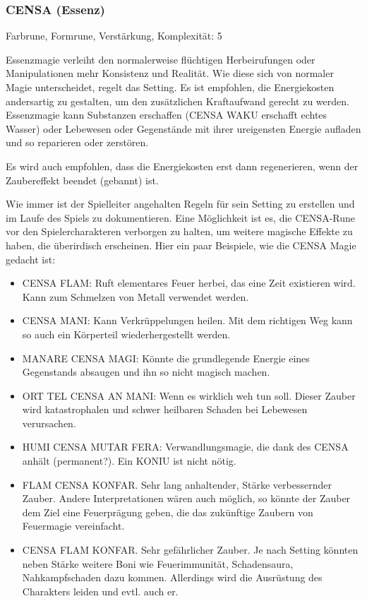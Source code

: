 \documentclass{article}
\begin{document}
\subsubsection{CENSA (Essenz)}

Farbrune, Formrune, Verstärkung, Komplexität: 5

Essenzmagie verleiht den normalerweise flüchtigen Herbeirufungen oder Manipulationen mehr Konsistenz und Realität. Wie
diese sich von normaler Magie unterscheidet, regelt das Setting. Es ist empfohlen, die Energiekosten andersartig zu
gestalten, um den zusätzlichen Kraftaufwand gerecht zu werden. Essenzmagie kann Substanzen erschaffen (CENSA WAKU
erschafft echtes Wasser) oder Lebewesen oder Gegenstände mit ihrer ureigensten Energie aufladen und so reparieren oder
zerstören.

Es wird auch empfohlen, dass die Energiekosten erst dann regenerieren, wenn der Zaubereffekt beendet (gebannt) ist.

Wie immer ist der Spielleiter angehalten Regeln für sein Setting zu erstellen und im Laufe des Spiels zu dokumentieren.
Eine Möglichkeit ist es, die CENSA-Rune vor den Spielercharakteren verborgen zu halten, um weitere magische Effekte zu
haben, die überirdisch erscheinen. Hier ein paar Beispiele, wie die CENSA Magie gedacht ist:

\begin{itemize}
\item CENSA FLAM: Ruft elementares Feuer herbei, das eine Zeit existieren wird. Kann zum Schmelzen von Metall verwendet werden.
\item CENSA MANI: Kann Verkrüppelungen heilen. Mit dem richtigen Weg kann so auch ein Körperteil wiederhergestellt werden.
\item MANARE CENSA MAGI: Könnte die grundlegende Energie eines Gegenstands absaugen und ihn so nicht magisch machen.
\item ORT TEL CENSA AN MANI: Wenn es wirklich weh tun soll. Dieser Zauber wird katastrophalen und schwer heilbaren Schaden bei Lebewesen verursachen.
\item HUMI CENSA MUTAR FERA: Verwandlungsmagie, die dank des CENSA anhält (permanent?). Ein KONIU ist nicht nötig.
\item FLAM CENSA KONFAR. Sehr lang anhaltender, Stärke verbessernder Zauber. Andere Interpretationen wären auch möglich, so könnte der Zauber dem Ziel eine Feuerprägung geben, die das zukünftige Zaubern von Feuermagie vereinfacht.
\item CENSA FLAM KONFAR. Sehr gefährlicher Zauber. Je nach Setting könnten neben Stärke weitere Boni wie Feuerimmunität, Schadensaura, Nahkampfschaden dazu kommen. Allerdings wird die Ausrüstung des Charakters leiden und evtl. auch er.
\end{itemize}
\end{document}

